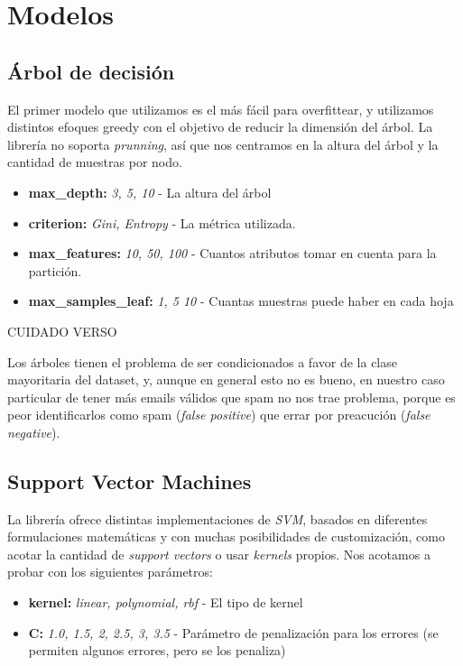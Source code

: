 \section{Modelos}
\subsection{Árbol de decisión}
El primer modelo que utilizamos es el más fácil para overfittear, y utilizamos distintos efoques greedy con el objetivo de reducir la dimensión del árbol.
La librería no soporta \textit{prunning}, así que nos centramos en la altura del árbol y la cantidad de muestras por nodo.
\begin{itemize}
\item \textbf{max\_depth:} \textit{3, 5, 10} - La altura del árbol
\item \textbf{criterion:} \textit{Gini, Entropy} - La métrica utilizada.
\item \textbf{max\_features:} \textit{10, 50, 100} - Cuantos atributos tomar en cuenta para la partición.
\item \textbf{max\_samples\_leaf:} \textit{1, 5 10} - Cuantas muestras puede haber en cada hoja
\end{itemize}
{\Large CUIDADO VERSO}

Los árboles tienen el problema de ser condicionados a favor de la clase mayoritaria del dataset, y, aunque en general esto no es bueno,
en nuestro caso particular de tener más emails válidos que spam no nos trae problema, porque es peor identificarlos como spam (\textit{false positive}) que errar por preacución (\textit{false negative}).

\subsection{Support Vector Machines}
La librería ofrece distintas implementaciones de \textit{SVM}, basados en diferentes formulaciones matemáticas y con muchas posibilidades de customización, como acotar la cantidad de \textit{support vectors} o usar \textit{kernels} propios. Nos acotamos a probar con los siguientes parámetros:
\begin{itemize}
\item \textbf{kernel:} \textit{linear, polynomial, rbf} - El tipo de kernel
\item \textbf{C:} \textit{1.0, 1.5, 2, 2.5, 3, 3.5} - Parámetro de penalización para los errores (se permiten algunos errores, pero se los penaliza)
\end{itemize}

